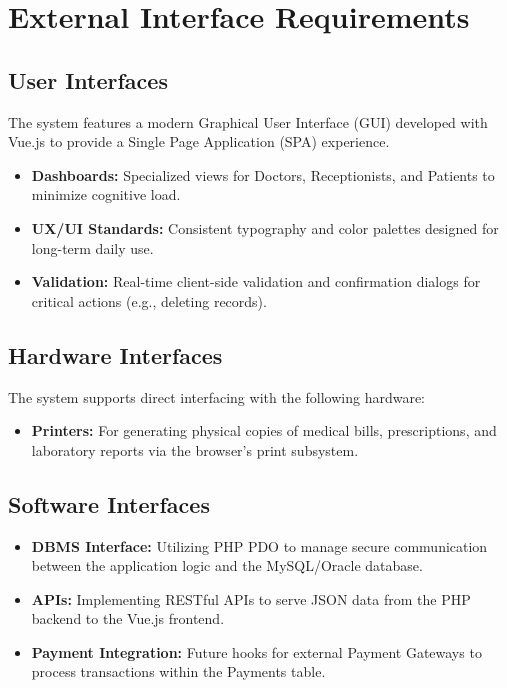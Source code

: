 \section{External Interface Requirements}

\subsection{User Interfaces}

The system features a modern Graphical User Interface (GUI) developed with Vue.js to provide a Single Page Application (SPA) experience.

\begin{itemize}
	\item \textbf{Dashboards:} Specialized views for Doctors, Receptionists, and Patients to minimize cognitive load.
	\item \textbf{UX/UI Standards:} Consistent typography and color palettes designed for long-term daily use.
	\item \textbf{Validation:} Real-time client-side validation and confirmation dialogs for critical actions (e.g., deleting records).
\end{itemize}

\subsection{Hardware Interfaces}

The system supports direct interfacing with the following hardware:

\begin{itemize}
	\item \textbf{Printers:} For generating physical copies of medical bills, prescriptions, and laboratory reports via the browser's print subsystem.
\end{itemize}

\subsection{Software Interfaces}

\begin{itemize}
	\item \textbf{DBMS Interface:} Utilizing PHP PDO to manage secure communication between the application logic and the MySQL/Oracle database.
	\item \textbf{APIs:} Implementing RESTful APIs to serve JSON data from the PHP backend to the Vue.js frontend.
	\item \textbf{Payment Integration:} Future hooks for external Payment Gateways to process transactions within the Payments table.
\end{itemize}

